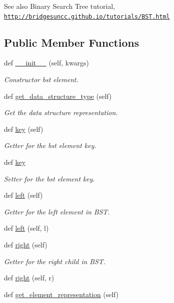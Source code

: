 \begin{DoxySeeAlso}{See also}
Binary Search Tree tutorial, \href{http://bridgesuncc.github.io/tutorials/BST.html}{\tt http\+://bridgesuncc.\+github.\+io/tutorials/\+B\+S\+T.\+html} 
\end{DoxySeeAlso}
\subsection*{Public Member Functions}
\begin{DoxyCompactItemize}
\item 
def \hyperlink{classbridges_1_1bst__element_1_1_b_s_t_element_ab5f7e1266a3e1777472702f5a3f595c5}{\+\_\+\+\_\+init\+\_\+\+\_\+} (self, kwargs)
\begin{DoxyCompactList}\small\item\em Constructor bst element. \end{DoxyCompactList}\item 
def \hyperlink{classbridges_1_1bst__element_1_1_b_s_t_element_ad6763a7381b91e16d9dc927a6f501c81}{get\+\_\+data\+\_\+structure\+\_\+type} (self)
\begin{DoxyCompactList}\small\item\em Get the data structure representation. \end{DoxyCompactList}\item 
def \hyperlink{classbridges_1_1bst__element_1_1_b_s_t_element_ab8fc663b1168808f83ab157e66c793d9}{key} (self)
\begin{DoxyCompactList}\small\item\em Getter for the bst element key. \end{DoxyCompactList}\item 
def \hyperlink{classbridges_1_1bst__element_1_1_b_s_t_element_a46236bc9db305c61429a56f7ed74df64}{key}
\begin{DoxyCompactList}\small\item\em Setter for the bst element key. \end{DoxyCompactList}\item 
def \hyperlink{classbridges_1_1bst__element_1_1_b_s_t_element_adb40ae0f98fe1cb7f153494c544d3f9f}{left} (self)
\begin{DoxyCompactList}\small\item\em Getter for the left element in B\+ST. \end{DoxyCompactList}\item 
def \hyperlink{classbridges_1_1bst__element_1_1_b_s_t_element_a0b45e63b73faabb6b969dd6222e07942}{left} (self, l)
\item 
def \hyperlink{classbridges_1_1bst__element_1_1_b_s_t_element_a3ec82fbc56a5e6309b69d2d963b483fd}{right} (self)
\begin{DoxyCompactList}\small\item\em Getter for the right child in B\+ST. \end{DoxyCompactList}\item 
def \hyperlink{classbridges_1_1bst__element_1_1_b_s_t_element_a978ae0db366dee59703ed266eebca0e9}{right} (self, r)
\item 
def \hyperlink{classbridges_1_1bst__element_1_1_b_s_t_element_a5f49ae18e50343ed63a83baa2c42e192}{get\+\_\+element\+\_\+representation} (self)
\end{DoxyCompactItemize}
